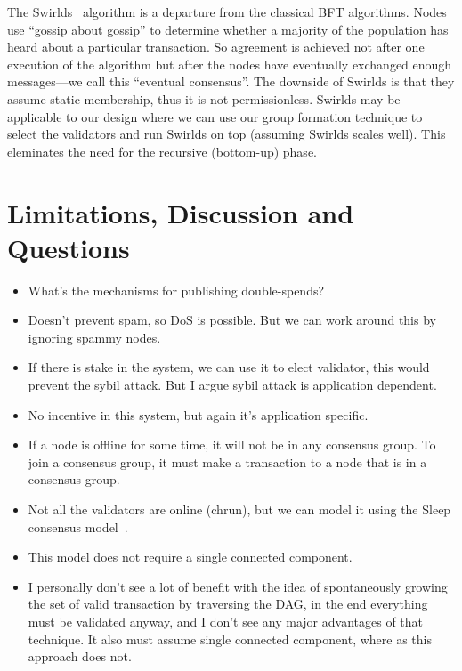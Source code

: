 The Swirlds~\cite{baird2016swirlds} algorithm is a departure from the classical
BFT algorithms. Nodes use ``gossip about gossip'' to determine whether a
majority of the population has heard about a particular transaction. So
agreement is achieved not after one execution of the algorithm but after the
nodes have eventually exchanged enough messages---we call this ``eventual
consensus''. The downside of Swirlds is that they assume static membership, thus
it is not permissionless. Swirlds may be applicable to our design where we can
use our group formation technique to select the validators and run Swirlds on
top (assuming Swirlds scales well). This eleminates the need for the recursive
(bottom-up) phase.


\section{Limitations, Discussion and Questions}
\begin{itemize}
\item What's the mechanisms for publishing double-spends?
\item Doesn't prevent spam, so DoS is possible. But we can work around this by
  ignoring spammy nodes.
\item If there is stake in the system, we can use it to elect validator, this
  would prevent the sybil attack. But I argue sybil attack is application
  dependent.
\item No incentive in this system, but again it's application specific.
\item If a node is offline for some time, it will not be in any consensus group.
  To join a consensus group, it must make a transaction to a node that is in a
  consensus group.
\item Not all the validators are online (chrun), but we can model it using the
  Sleep consensus model~\cite{bentov2016sleepy}.
\item This model does not require a single connected component. 
\item I personally don't see a lot of benefit with the idea of spontaneously
  growing the set of valid transaction by traversing the DAG, in the end
  everything must be validated anyway, and I don't see any major advantages of
  that technique. It also must assume single connected component, where as this
  approach does not.
\end{itemize}

